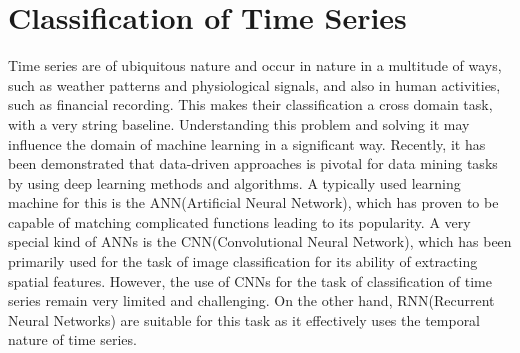 \section{Classification of Time Series}
Time series are of ubiquitous nature and occur in nature in a multitude of ways, such as weather patterns and physiological signals, and also in human activities, such as financial recording. This makes their classification a cross domain task, with a very string baseline. Understanding this problem and solving it may influence the domain of machine learning in a significant way\cite{wang2017time}. Recently, it has been demonstrated that data-driven approaches is pivotal for data mining tasks by using deep learning methods and algorithms. A typically used learning machine for this is the ANN(Artificial Neural Network), which has proven to be capable of matching complicated functions leading to its popularity. A very special kind of ANNs is the CNN(Convolutional Neural Network), which has been primarily used for the task of image classification for its ability of extracting spatial features. However, the use of CNNs for the task of classification of time series remain very limited and challenging. On the other hand, RNN(Recurrent Neural Networks) are suitable for this task as it effectively uses the temporal nature of time series.\cite{yang2019time}
